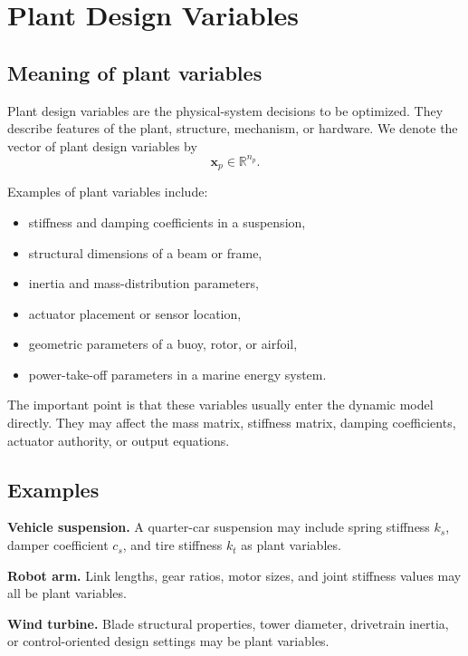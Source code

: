 \documentclass[11pt]{article}
\newcommand{\vect}[1]{\boldsymbol{#1}}
\newcommand{\xp}{\vect{x}_p}
\newcommand{\R}{\mathbb{R}}
\begin{document}
\section{Plant Design Variables}

\subsection{Meaning of plant variables}

Plant design variables are the physical-system decisions to be optimized. They describe features of the plant, structure, mechanism, or hardware. We denote the vector of plant design variables by
\begin{equation}
\xp \in \R^{n_p}.
\end{equation}

Examples of plant variables include:
\begin{itemize}[leftmargin=1.4em]
  \item stiffness and damping coefficients in a suspension,
  \item structural dimensions of a beam or frame,
  \item inertia and mass-distribution parameters,
  \item actuator placement or sensor location,
  \item geometric parameters of a buoy, rotor, or airfoil,
  \item power-take-off parameters in a marine energy system.
\end{itemize}

The important point is that these variables usually enter the dynamic model directly. They may affect the mass matrix, stiffness matrix, damping coefficients, actuator authority, or output equations.

\subsection{Examples}

\textbf{Vehicle suspension.} A quarter-car suspension may include spring stiffness $k_s$, damper coefficient $c_s$, and tire stiffness $k_t$ as plant variables.

\textbf{Robot arm.} Link lengths, gear ratios, motor sizes, and joint stiffness values may all be plant variables.

\textbf{Wind turbine.} Blade structural properties, tower diameter, drivetrain inertia, or control-oriented design settings may be plant variables.
\end{document}
